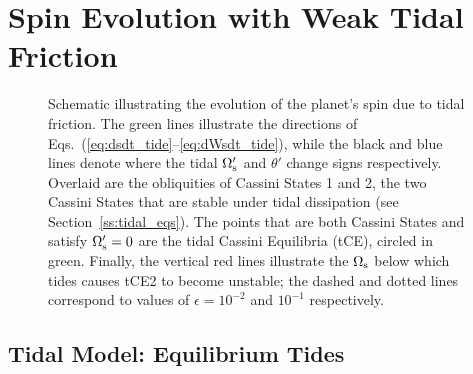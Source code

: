 \documentclass[
        fleqn,
        usenatbib,
    ]{mnras}
\begin{document}
\section{Spin Evolution with Weak Tidal Friction}\label{ss:full_tide_prob}

\begin{figure}
    \centering
    \caption{Schematic illustrating the evolution of the planet's spin due to
    tidal friction. The green lines illustrate the directions of
    Eqs.~(\ref{eq:dsdt_tide}--\ref{eq:dWsdt_tide}), while the black and blue
    lines denote where the tidal $\Omega_{\rm s}'$ and $\theta'$ change signs
    respectively. Overlaid are the obliquities of Cassini States 1 and 2, the
    two Cassini States that are stable under tidal dissipation (see
    Section~\ref{ss:tidal_eqs}). The points that are both Cassini States and
    satisfy $\Omega_{\rm s}' = 0$ are the tidal Cassini Equilibria (tCE),
    circled in green. Finally, the vertical red lines illustrate the
    $\Omega_{\rm s}$ below which tides causes tCE2 to become unstable; the
    dashed and dotted lines correspond to values of $\epsilon = 10^{-2}$ and
    $10^{-1}$ respectively.
    }\label{fig:6equils}
\end{figure}

\subsection{Tidal Model: Equilibrium Tides}\label{sss:weaktide}
\end{document}
